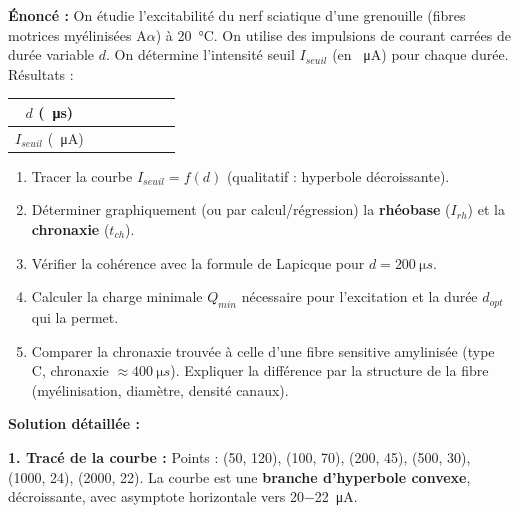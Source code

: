 \documentclass[11pt]{article}
\begin{document}
\begin{exoresolu}
\textbf{Énoncé :} On étudie l'excitabilité du nerf sciatique d'une grenouille (fibres motrices myélinisées A$\alpha$) à \SI{20}{\celsius}. On utilise des impulsions de courant carrées de durée variable $d$. On détermine l'intensité seuil $I_{seuil}$ (en \SI{}{\micro A}) pour chaque durée. Résultats :

\begin{center}
\begin{tabularx}{\linewidth}{|c|>{\centering\arraybackslash}X|>{\centering\arraybackslash}X|>{\centering\arraybackslash}X|>{\centering\arraybackslash}X|>{\centering\arraybackslash}X|>{\centering\arraybackslash}X|}\hline
\rowcolor{popblueL}
$d$ (\SI{}{\micro s}) & 50 & 100 & 200 & 500 & 1000 & 2000 \\ \hline
$I_{seuil}$ (\SI{}{\micro A}) & 120 & 70 & 45 & 30 & 24 & 22 \\ \hline
\end{tabularx}
\end{center}

\begin{enumerate}
    \item Tracer la courbe $I_{seuil} = f(d)$ (qualitatif : hyperbole décroissante).
    \item Déterminer graphiquement (ou par calcul/régression) la \textbf{rhéobase} ($I_{rh}$) et la \textbf{chronaxie} ($t_{ch}$).
    \item Vérifier la cohérence avec la formule de Lapicque pour $d = \SI{200}{\micro s}$.
    \item Calculer la charge minimale $Q_{min}$ nécessaire pour l'excitation et la durée $d_{opt}$ qui la permet.
    \item Comparer la chronaxie trouvée à celle d'une fibre sensitive amylinisée (type C, chronaxie $\approx \SI{400}{\micro s}$). Expliquer la différence par la structure de la fibre (myélinisation, diamètre, densité canaux).
\end{enumerate}

\tcblower
\textbf{Solution détaillée :}

\textbf{1. Tracé de la courbe :}
Points : (50, 120), (100, 70), (200, 45), (500, 30), (1000, 24), (2000, 22).
La courbe est une \textbf{branche d'hyperbole convexe}, décroissante, avec asymptote horizontale vers \SI{20-22}{\micro A}.


\end{exoresolu}
\end{document}
